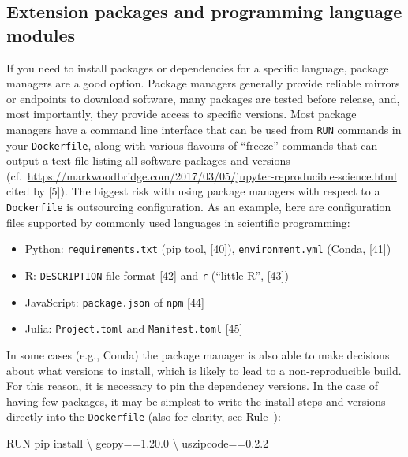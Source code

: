 \documentclass[10pt,letterpaper]{article}
\newenvironment{Shaded}{\begin{snugshade}}{\end{snugshade}}
\newcommand{\ExtensionTok}[1]{#1}
\newcommand{\NormalTok}[1]{#1}
\providecommand{\tightlist}{%
  \setlength{\itemsep}{0pt}\setlength{\parskip}{0pt}}
\begin{document}
\hypertarget{extension-packages-and-programming-language-modules}{%
\subsection{Extension packages and programming language
modules}\label{extension-packages-and-programming-language-modules}}

If you need to install packages or dependencies for a specific language,
package managers are a good option. Package managers generally provide
reliable mirrors or endpoints to download software, many packages are
tested before release, and, most importantly, they provide access to
specific versions. Most package managers have a command line interface
that can be used from \texttt{RUN} commands in your \texttt{Dockerfile},
along with various flavours of ``freeze'' commands that can output a
text file listing all software packages and versions
(cf.~\url{https://markwoodbridge.com/2017/03/05/jupyter-reproducible-science.html}
cited by {[}5{]}). The biggest risk with using package managers with
respect to a \texttt{Dockerfile} is outsourcing configuration. As an
example, here are configuration files supported by commonly used
languages in scientific programming:

\begin{itemize}
\tightlist
\item
  Python: \texttt{requirements.txt} (pip tool, {[}40{]}),
  \texttt{environment.yml} (Conda, {[}41{]})
\item
  R: \texttt{DESCRIPTION} file format {[}42{]} and \texttt{r} (``little
  R'', {[}43{]})
\item
  JavaScript: \texttt{package.json} of \texttt{npm} {[}44{]}
\item
  Julia: \texttt{Project.toml} and \texttt{Manifest.toml} {[}45{]}
\end{itemize}

In some cases (e.g., Conda) the package manager is also able to make
decisions about what versions to install, which is likely to lead to a
non-reproducible build. For this reason, it is necessary to pin the
dependency versions. In the case of having few packages, it may be
simplest to write the install steps and versions directly into the
\texttt{Dockerfile} (also for clarity, see
\hyperref[{rule:clarity}]{Rule~}):

\footnotesize

\begin{Shaded}
\begin{Highlighting}[]
\ExtensionTok{RUN}\NormalTok{ pip install \textbackslash{}}
\NormalTok{  geopy==1.20.0 \textbackslash{}}
\NormalTok{  uszipcode==0.2.2}
\end{Highlighting}
\end{Shaded}
\end{document}

